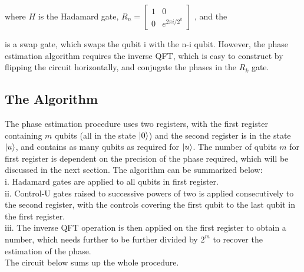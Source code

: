 \documentclass{article}
\begin{document}
where $H$ is the Hadamard gate, \(R_n = 
\begin{bmatrix}
    1 & 0 \\
    0 & e^{2\pi i/2^k}
\end{bmatrix} \)
, and the  is a swap gate, which swaps the qubit i with the n-i qubit. However, the phase estimation algorithm requires the inverse QFT, which is easy to construct by flipping the circuit horizontally, and conjugate the phases in the $R_k$ gate.
\pagebreak
\subsection{The Algorithm}
The phase estimation procedure uses two registers, with the first register containing $m$ qubits (all in the state $\ket{0}$) and the second register is in the state $\ket{u}$, and contains as many qubits as required for $\ket{u}$. The number of qubits $m$ for first register is dependent on the precision of the phase required, which will be discussed in the next section. The algorithm can be summarized below:\\
i. Hadamard gates are applied to all qubits in first register.\\
ii. Control-U gates raised to successive powers of two is applied consecutively to the second register, with the controls covering the first qubit to the last qubit in the first register.\\
iii. The inverse QFT operation is then applied on the first register to obtain a number, which needs further to be further divided by $2^m$ to recover the estimation of the phase.\\
The circuit below sums up the whole procedure.
\vspace{5mm}
\end{document}
